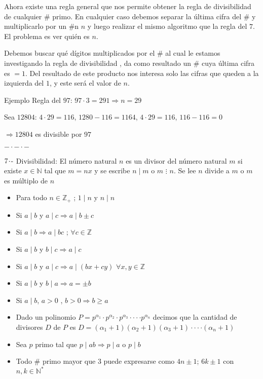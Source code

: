 Ahora existe una regla general que nos permite obtener la regla de divisibilidad de cualquier \# primo. En cualquier caso debemos separar la última cifra del \# y multiplicarlo por un \#n $n$ y luego realizar el mismo algoritmo que la regla del $7$. El problema es ver quién es $n$.

Debemos buscar qué dígitos multiplicados por el \# al cual le estamos investigando la regla de divisibilidad , da como resultado un \# cuya última cifra es $= 1$. Del resultado de este producto nos interesa solo las cifras que queden a la izquierda del $1$, y este será el valor de $n$.

Ejemplo Regla del $97$: $97\cdot3=291 \Longrightarrow n=29$

\hspace{1cm}Sea $12804$: $4\cdot29=116$, $1280-116=1164$, $4\cdot29=116$, $116-116=0$

$\Longrightarrow 12804$ es divisible por $97$
\begin{center}
    \texttt{$-\cdot-\cdot-$}
\end{center}
$7\hspace{-0.05cm}\cdot\hspace{-0.05cm}\text{-}$ Divisibilidad: El número natural $n$ es un divisor del número natural $m$ si existe $x \in \mathbb{N}$ tal que $m = nx$ y se escribe $n \mid m$ o $m$ $\vdots$ $n$. Se lee $n$ divide a $m$ o $m$ es múltiplo de $n$
\begin{itemize}
    \def\labelitemi{-}
    \addtolength{\itemindent}{1cm}
    \item Para todo $n \in \mathbb{Z}_+$ ; $1 \mid n$ y $n \mid n$
    \item Si $a \mid b$ y $a \mid c \Longrightarrow a \mid b \pm c$
    \item Si $a \mid b \Longrightarrow a \mid bc$ ; $\forall c \in \mathbb{Z}$
    \item Si $a \mid b$ y $b \mid c \Longrightarrow a \mid c$
    \item Si $a \mid b$ y $a \mid c \Longrightarrow a \mid (bx + cy)$ $\forall x,y \in \mathbb{Z}$ 
    \item Si $a \mid b$ y $b \mid a \Longrightarrow a = \pm b$ 
    \item Si $a \mid b$, $a > 0$ , $b > 0 \Longrightarrow b \ge a$
    \item Dado un polinomio $P=p^{\alpha_1} \cdot p^{\alpha_2} \cdot p^{\alpha_3} \cdot\cdot\cdot\cdot p^{\alpha_n}$ decimos que la cantidad de divisores $D$ de $P$ es $D=(\alpha_1 + 1)(\alpha_2 + 1)(\alpha_3 + 1) \cdot\cdot\cdot\cdot (\alpha_n + 1)$
    \item Sea $p$ primo tal que $p \mid ab \Longrightarrow p \mid a$ o $p \mid b$
    \item Todo \# primo mayor que $3$ puede expresarse como $4n \pm 1$; $6k \pm 1$ con $n, k \in \mathbb{N}^*$
\end{itemize}

